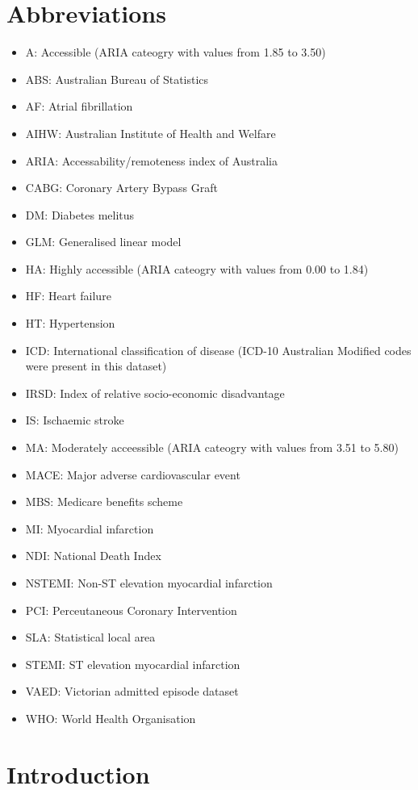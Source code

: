 \documentclass[11pt]{article}
\begin{document}
\section{Abbreviations} 

\begin{itemize}
\item A: Accessible (ARIA cateogry with values from 1.85 to 3.50)
\item ABS: Australian Bureau of Statistics
\item AF: Atrial fibrillation
\item AIHW: Australian Institute of Health and Welfare
\item ARIA: Accessability/remoteness index of Australia
\item CABG: Coronary Artery Bypass Graft
\item DM: Diabetes melitus
\item GLM: Generalised linear model
\item HA: Highly accessible (ARIA cateogry with values from 0.00 to 1.84)
\item HF: Heart failure
\item HT: Hypertension
\item ICD: International classification of disease (ICD-10 Australian Modified codes were present in this dataset)
\item IRSD: Index of relative socio-economic disadvantage
\item IS: Ischaemic stroke
\item MA: Moderately acceessible (ARIA cateogry with values from 3.51 to 5.80)
\item MACE: Major adverse cardiovascular event
\item MBS: Medicare benefits scheme
\item MI: Myocardial infarction
\item NDI: National Death Index
\item NSTEMI: Non-ST elevation myocardial infarction
\item PCI: Perceutaneous Coronary Intervention
\item SLA: Statistical local area
\item STEMI: ST elevation myocardial infarction
\item VAED: Victorian admitted episode dataset
\item WHO: World Health Organisation
\end{itemize}

\pagebreak

\section{Introduction}
\end{document}
